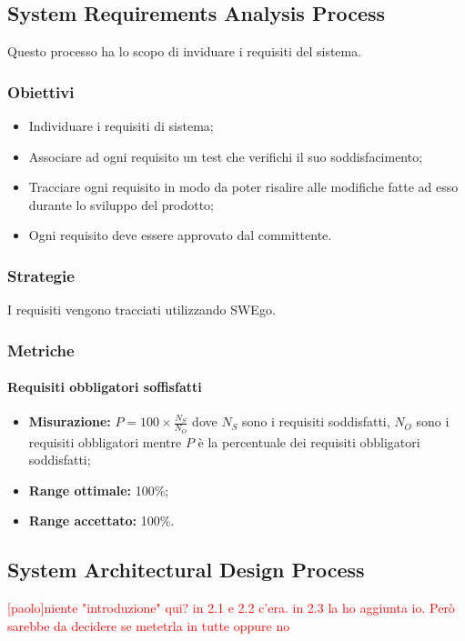 \subsection{System Requirements Analysis Process}
Questo processo ha lo scopo di inviduare i requisiti del sistema.
\subsubsection{Obiettivi}
\begin{itemize}
	\item Individuare i requisiti di sistema;
	\item Associare ad ogni requisito un test che verifichi il suo soddisfacimento; 
	\item Tracciare ogni requisito in modo da poter risalire alle modifiche fatte ad esso durante lo sviluppo del prodotto;
	\item Ogni requisito deve essere approvato dal committente.
\end{itemize}
\subsubsection{Strategie}
I requisiti vengono tracciati utilizzando SWEgo.
\subsubsection{Metriche}
\paragraph{Requisiti obbligatori soffisfatti}
\begin{itemize}
	\item \textbf{Misurazione:} $P=100\times\frac{N_S}{N_O}$ dove $N_S$ sono i requisiti soddisfatti, $N_O$ sono i requisiti obbligatori mentre $P$ è la percentuale dei requisiti obbligatori soddisfatti;
	\item \textbf{Range ottimale:} 100\%;
	\item \textbf{Range accettato:} 100\%.
\end{itemize}

\subsection{System Architectural Design Process}
\textcolor{red} { [paolo]niente "introduzione" qui? in 2.1 e 2.2 c'era. in 2.3 la ho aggiunta io. Però sarebbe da decidere se metetrla in tutte oppure no }
